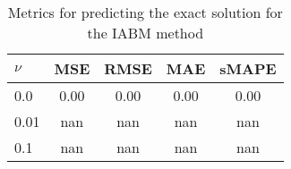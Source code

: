 \begin{table}[H]
  \caption{Metrics for predicting the exact solution for the IABM method}\label{table:comparison_exact_metrics_iabm}
  \centering
  \begin{tabular}{lcccc}
    \toprule
    \(\nu \) & MSE  & RMSE & MAE  & sMAPE \\
    \midrule
    0.0      & 0.00 & 0.00 & 0.00 & 0.00  \\
    0.01     & nan  & nan  & nan  & nan   \\
    0.1      & nan  & nan  & nan  & nan   \\
    \bottomrule
  \end{tabular}
\end{table}




